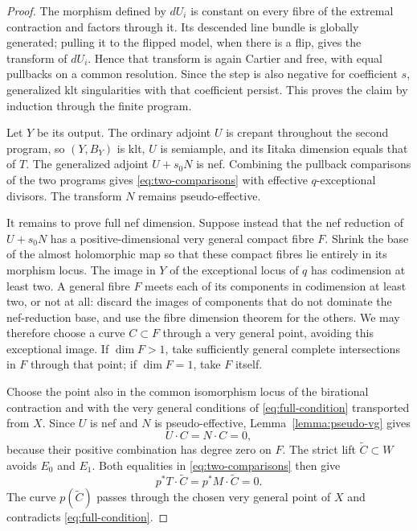 \begin{proof}
The morphism defined by $dU_i$ is constant on every fibre of the
extremal contraction and factors through it.  Its descended line
bundle is globally generated; pulling it to the flipped model, when
there is a flip, gives the transform of $dU_i$.  Hence that transform
is again Cartier and free, with equal pullbacks on a common
resolution.  Since the step is also negative for coefficient $s$,
generalized klt singularities with that coefficient persist.  This
proves the claim by induction through the finite program.

Let $Y$ be its output.  The ordinary adjoint $U$ is crepant throughout
the second program, so $(Y,B_Y)$ is klt, $U$ is semiample, and its
Iitaka dimension equals that of $T$.  The generalized adjoint
$U+s_0N$ is nef.  Combining the pullback comparisons of the two
programs gives \eqref{eq:two-comparisons} with effective
$q$-exceptional divisors.  The transform $N$ remains pseudo-effective.

It remains to prove full nef dimension.  Suppose instead that the
nef reduction of $U+s_0N$ has a positive-dimensional very general
compact fibre $F$.  Shrink the base of the almost holomorphic map so
that these compact fibres lie entirely in its morphism locus.  The
image in $Y$ of the exceptional locus of $q$ has
codimension at least two.  A general fibre $F$ meets each of its
components in codimension at least two, or not at all: discard the
images of components that do not dominate the nef-reduction base,
and use the fibre dimension theorem for the others.  We may
therefore choose a curve $C\subset F$ through a very general point,
avoiding this exceptional image.  If $\dim F>1$, take sufficiently
general complete intersections in $F$ through that point; if
$\dim F=1$, take $F$ itself.

Choose the point also in the common isomorphism locus of the
birational contraction and with the very general conditions of
\eqref{eq:full-condition} transported from $X$.  Since $U$ is nef
and $N$ is pseudo-effective, Lemma~\ref{lemma:pseudo-vg} gives
\[
                    U\cdot C=N\cdot C=0,
\]
because their positive combination has degree zero on $F$.
The strict lift $\widetilde C\subset W$ avoids $E_0$ and $E_1$.
Both equalities in \eqref{eq:two-comparisons} then give
\[
               p^*T\cdot\widetilde C
                =p^*M\cdot\widetilde C=0.
\]
The curve $p(\widetilde C)$ passes through the chosen very general
point of $X$ and contradicts \eqref{eq:full-condition}.
\end{proof}

